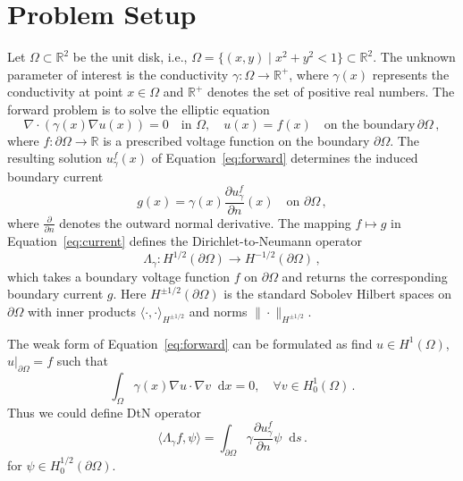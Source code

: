 \documentclass{article}
\def\Eqref#1{Equation~\ref{#1}}
\newcommand*\diff{\mathop{}\mathrm{d}}
\begin{document}
\section{Problem Setup}\label{sec:problem_setup} 
Let $\Omega \subset \mathbb{R}^2$ be the unit disk, i.e., $\Omega = \{(x, y) \mid x^2 + y^2 < 1\} \subset \mathbb{R}^2$. The unknown parameter of interest is the conductivity $\gamma: \Omega \to \mathbb{R}^+$, where $\gamma(x)$ represents the conductivity at point $x \in \Omega$ and $\mathbb{R}^+$ denotes the set of positive real numbers. The forward problem is to solve the elliptic equation
\begin{equation}\label{eq:forward}
\nabla \cdot (\gamma(x)\nabla u(x)) = 0 \quad \text{in } \Omega, \quad u(x) = f(x) \quad \text{on the boundary} \, \partial \Omega\,,
\end{equation}
where $f: \partial \Omega \to \mathbb{R}$ is a prescribed voltage function on the boundary $\partial \Omega$. The resulting solution $u_{\gamma}^{f}(x)$ of \Eqref{eq:forward} determines the induced boundary current
\begin{equation}\label{eq:current}
g(x) = \gamma(x)\frac{\partial u_{\gamma}^{f}}{\partial n}(x) \quad \text{on } \partial\Omega\,,
\end{equation}
where $\frac{\partial}{\partial n} $ denotes the outward normal derivative. 
The mapping $f \mapsto g$ in \Eqref{eq:current} defines the Dirichlet-to-Neumann operator
\begin{equation}\label{eq:DtN_cont}
\Lambda_\gamma: H^{1/2}(\partial\Omega) \to H^{-1/2}(\partial\Omega)\,, 
\end{equation}
which takes a boundary voltage function $f$ on $\partial\Omega$ and returns the corresponding boundary current $g$. Here $H^{\pm 1/2}(\partial\Omega)$ is the standard Sobolev Hilbert spaces on $\partial\Omega$ with inner products
$\langle\cdot,\cdot\rangle_{H^{\pm 1/2}}$ and norms $\|\cdot\|_{H^{\pm 1/2}}$.

The weak form of \Eqref{eq:forward} can be formulated as find $u \in H^{1}(\Omega)$, $u|_{\partial \Omega} = f$ such that
\begin{equation}\label{eqn:weak_form}
    \int_{\Omega} \gamma(x) \nabla u \cdot \nabla v\diff x = 0,\quad \forall v \in H^{1}_{0}(\Omega)\,.
\end{equation}
Thus we could define DtN operator
\begin{equation}\label{weakform}
    \langle\Lambda_\gamma f, \psi\rangle = \int_{\partial\Omega} \gamma \frac{\partial u_{\gamma}^{f}}{\partial n} \psi \diff s\,.
\end{equation}
for $\psi \in H^{1/2}_0(\partial\Omega)$.
\end{document}
